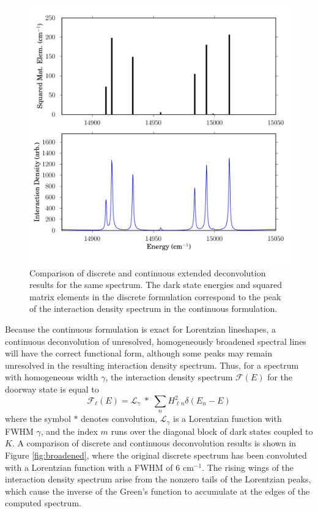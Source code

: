 \documentclass[12pt]{mitthesis}
\begin{document}
\begin{figure}
  \caption{Comparison of discrete and continuous extended
    deconvolution results for the same spectrum.  The dark state
    energies and squared matrix elements in the discrete formulation
    correspond to the peak of the interaction density spectrum in the
    continuous formulation.}
  \label{fig:compare-dark}
  \centering
  \includegraphics[width=6in]{smalley-compare-fwhm1.png}
\end{figure}

Because the continuous formulation is exact for Lorentzian lineshapes,
a continuous deconvolution of unresolved, homogeneously broadened
spectral lines will have the correct functional form, although some
peaks may remain unresolved in the resulting interaction density
spectrum.  Thus, for a spectrum with homogeneous width $\gamma$, the
interaction density spectrum $\mathcal{F}(E)$ for the doorway state is
equal to
\begin{equation}
  \mathcal{F}_{\ell}(E) = 
    \mathcal{L}_{\gamma} \; * \;
    \sum_n H_{\ell n}^2 \delta(E_n - E)
\end{equation}
where the symbol $*$ denotes convolution, $\mathcal{L}_{\gamma}$ is a
Lorentzian function with FWHM $\gamma$, and the index $m$ runs over
the diagonal block of dark states coupled to $K$.  A comparison of
discrete and continuous deconvolution results is shown in Figure
\ref{fig:broadened}, where the original discrete spectrum has been
convoluted with a Lorentzian function with a FWHM of 6 cm$^{-1}$.  The
rising wings of the interaction density spectrum arise from the
nonzero tails of the Lorentzian peaks, which cause the inverse of the
Green's function to accumulate at the edges of the computed spectrum.
\end{document}
